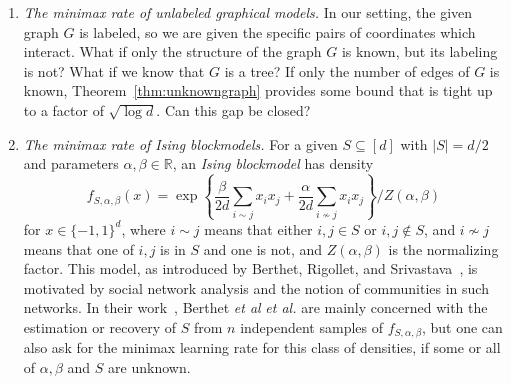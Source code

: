 \documentclass[letterpaper]{amsart}
\makeatletter
\newcommand{\R}{\mathbb{R}}
\let\originalleft\left
\let\originalright\right
\def\left#1{\mathopen{}\originalleft#1}
\def\right#1{\originalright#1\mathclose{}}
\newcommand*{\etal}{
	\@ifnextchar{.}
    {\emph{et al}}
    {\emph{et al.}\@\xspace}
}
\newcommand{\thmref}[1]{Theorem~\ref{thm:#1}}
\numberwithin{thm}{section}
\theoremstyle{definition}
\theoremstyle{plain}
\makeatother
\begin{document}
\begin{enumerate}[label=\textit{\arabic*.}]
\item \textit{The minimax rate of unlabeled graphical models.}  In our
  setting, the given graph $G$ is labeled, so we are given the
  specific pairs of coordinates which interact. What if only the
  structure of the graph $G$ is known, but its labeling is not? What
  if we know that $G$ is a tree?  If only the number of edges of $G$
  is known, \thmref{unknowngraph} provides some bound that is tight up
  to a factor of $\sqrt{\log d}$. Can this gap be closed?

\item \textit{The minimax rate of Ising blockmodels. } For a given
  $S\subseteq [d]$ with $|S|=d/2$ and parameters
  $\alpha,\beta \in \R$, an \emph{Ising blockmodel} has density
  \[
    f_{S,\alpha,\beta}(x) = \exp\left\{ \frac{\beta}{2d} \sum_{i \sim j} x_i x_j + \frac{\alpha}{2d} \sum_{i \not\sim j} x_i x_j \right\} \bigg / Z(\alpha,\beta) 
  \]
  for $x \in \{-1, 1\}^d$, where $i \sim j$ means that either
  $i, j \in S$ or $i, j \not\in S$, and $i \not\sim j$ means that one
  of $i, j$ is in $S$ and one is not, and $Z(\alpha,\beta)$ is the
  normalizing factor. This model, as introduced by Berthet, Rigollet,
  and Srivastava~\cite{berthet}, is motivated by social network
  analysis and the notion of communities in such networks. In their
  work~\cite{berthet}, Berthet\etal are mainly concerned with the
  estimation or recovery of $S$ from $n$ independent samples of
  $f_{S, \alpha, \beta}$, but one can also ask for the minimax
  learning rate for this class of densities, if some or all of
  $\alpha, \beta$ and $S$ are unknown.

\end{enumerate}




\end{document}
